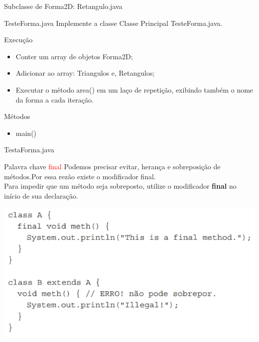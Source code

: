 \documentclass[11pt,aspectratio=43,ignorenonframetext,t]{beamer}
\begin{document}
\begin{frame}{Subclasse de Forma2D: Retangulo.java}
\small{}
\end{frame}
\begin{frame}{TesteForma.java}
  Implemente a classe Classe Principal TesteForma.java.
  \tiny
  \begin{block}{Execução}
   \begin{itemize}
    \item Conter um array de objetos Forma2D;
    \item Adicionar ao array: Triangulos e, Retangulos;
    \item Executar o método area() em um laço de repetição, exibindo também o 
nome da forma a cada iteração.
   \end{itemize}
  \end{block}
  \begin{block}{Métodos}
   \begin{itemize}
     \item main()
   \end{itemize}
  \end{block}

\end{frame}
\begin{frame}{TestaForma.java}
\small{}
\end{frame}
\begin{frame}{Palavra chave \textcolor{red}{final}}
  Podemos precisar evitar, herança e sobreposição de métodos.Por essa rezão 
existe o modificador final. \\ 
Para impedir que um método seja sobreposto, utilize o modificador 
  \textbf{final} no início de sua declaração.
  \begin{center}
  \includegraphics[height=0.5\paperheight]{fig/aula16/final_metodo.png} \\
 \end{center}
\end{frame}
\end{document}
